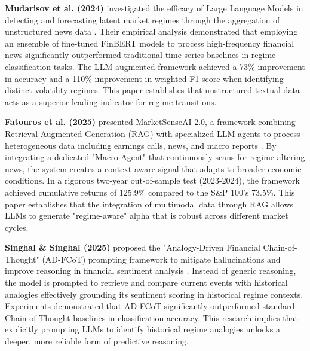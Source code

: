 \documentclass[12pt, a4paper]{report}
\begin{document}
\textbf{Mudarisov et al. (2024)} investigated the efficacy of Large Language Models in detecting and forecasting latent market regimes through the aggregation of unstructured news data \cite{mudarisov2024}. Their empirical analysis demonstrated that employing an ensemble of fine-tuned FinBERT models to process high-frequency financial news significantly outperformed traditional time-series baselines in regime classification tasks. The LLM-augmented framework achieved a 73\% improvement in accuracy and a 110\% improvement in weighted F1 score when identifying distinct volatility regimes. This paper establishes that unstructured textual data acts as a superior leading indicator for regime transitions.

\textbf{Fatouros et al. (2025)} presented MarketSenseAI 2.0, a framework combining Retrieval-Augmented Generation (RAG) with specialized LLM agents to process heterogeneous data including earnings calls, news, and macro reports \cite{fatouros2025}. By integrating a dedicated "Macro Agent" that continuously scans for regime-altering news, the system creates a context-aware signal that adapts to broader economic conditions. In a rigorous two-year out-of-sample test (2023-2024), the framework achieved cumulative returns of 125.9\% compared to the S\&P 100's 73.5\%. This paper establishes that the integration of multimodal data through RAG allows LLMs to generate "regime-aware" alpha that is robust across different market cycles.

\textbf{Singhal \& Singhal (2025)} proposed the "Analogy-Driven Financial Chain-of-Thought" (AD-FCoT) prompting framework to mitigate hallucinations and improve reasoning in financial sentiment analysis \cite{singhal2025}. Instead of generic reasoning, the model is prompted to retrieve and compare current events with historical analogies effectively grounding its sentiment scoring in historical regime contexts. Experiments demonstrated that AD-FCoT significantly outperformed standard Chain-of-Thought baselines in classification accuracy. This research implies that explicitly prompting LLMs to identify historical regime analogies unlocks a deeper, more reliable form of predictive reasoning.
\end{document}
